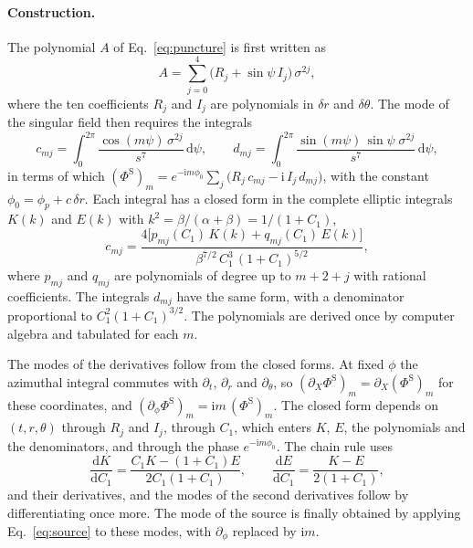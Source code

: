 \documentclass[11pt]{article}
\newcommand{\ii}{\mathrm{i}}
\newcommand{\dd}{\mathrm{d}}
\newcommand{\PhiS}{\Phi^{\mathrm{S}}}
\begin{document}
\paragraph{Construction.} The polynomial $A$ of Eq.~\eqref{eq:puncture} is
first written as
\begin{equation}
  \label{eq:A_split}
  A = \sum_{j=0}^{4}\bigl(R_j + \sin\psi\,I_j\bigr)\,\sigma^{2j},
\end{equation}
where the ten coefficients $R_j$ and $I_j$ are polynomials in $\delta r$ and
$\delta\theta$. The mode of the singular field then requires the integrals
\begin{equation}
  \label{eq:old_integrals}
  c_{mj} = \int_0^{2\pi}\frac{\cos(m\psi)\,\sigma^{2j}}{s^7}\,\dd\psi, \qquad
  d_{mj} = \int_0^{2\pi}\frac{\sin(m\psi)\,\sin\psi\;\sigma^{2j}}{s^7}\,\dd\psi,
\end{equation}
in terms of which
$(\PhiS)_m = e^{-\ii m\phi_0}\sum_j\bigl(R_j\,c_{mj} - \ii\,I_j\,d_{mj}\bigr)$,
with the constant $\phi_0=\phi_p+c\,\delta r$. Each integral has a closed form
in the complete elliptic integrals $K(k)$ and $E(k)$ with
$k^2=\beta/(\alpha+\beta)=1/(1+C_1)$,
\begin{equation}
  \label{eq:old_closed}
  c_{mj} = \frac{4\bigl[p_{mj}(C_1)\,K(k) + q_{mj}(C_1)\,E(k)\bigr]}{\beta^{7/2}\,C_1^3\,(1+C_1)^{5/2}},
\end{equation}
where $p_{mj}$ and $q_{mj}$ are polynomials of degree up to $m+2+j$ with
rational coefficients. The integrals $d_{mj}$ have the same form, with a
denominator proportional to $C_1^2(1+C_1)^{3/2}$. The polynomials are derived
once by computer algebra and tabulated for each $m$.

The modes of the derivatives follow from the closed forms. At fixed $\phi$ the
azimuthal integral commutes with $\partial_t$, $\partial_r$ and
$\partial_\theta$, so $(\partial_X\PhiS)_m=\partial_X(\PhiS)_m$ for these
coordinates, and $(\partial_\phi\PhiS)_m=\ii m\,(\PhiS)_m$. The closed form
depends on $(t,r,\theta)$ through $R_j$ and $I_j$, through $C_1$, which enters
$K$, $E$, the polynomials and the denominators, and through the phase
$e^{-\ii m\phi_0}$. The chain rule uses
\begin{equation}
  \label{eq:dKdC}
  \frac{\dd K}{\dd C_1} = \frac{C_1K-(1+C_1)E}{2C_1(1+C_1)}, \qquad
  \frac{\dd E}{\dd C_1} = \frac{K-E}{2(1+C_1)},
\end{equation}
and their derivatives, and the modes of the second derivatives follow by
differentiating once more. The mode of the source is finally obtained by
applying Eq.~\eqref{eq:source} to these modes, with $\partial_\phi$ replaced
by $\ii m$.
\end{document}
